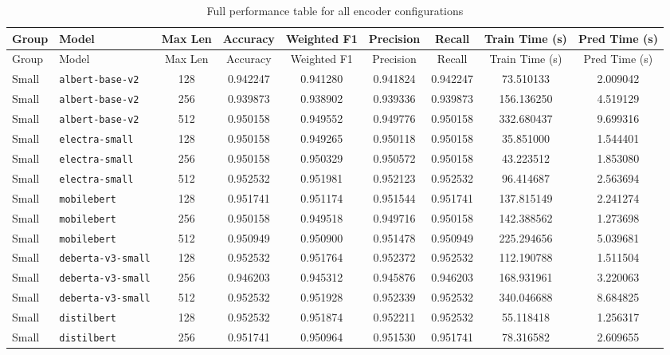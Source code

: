 \documentclass[11pt]{article}
\begin{document}
\begin{landscape}
\scriptsize
\begin{longtable}{llccccccc}
\caption{Full performance table for all encoder configurations} \\
\toprule
Group & Model & Max Len & Accuracy & Weighted F1 & Precision & Recall & Train Time (s) & Pred Time (s) \\
\midrule
\endfirsthead
\toprule
Group & Model & Max Len & Accuracy & Weighted F1 & Precision & Recall & Train Time (s) & Pred Time (s) \\
\midrule
\endhead

Small & \texttt{albert-base-v2} & 128 & 0.942247 & 0.941280 & 0.941824 & 0.942247 & 73.510133 & 2.009042 \\
Small & \texttt{albert-base-v2} & 256 & 0.939873 & 0.938902 & 0.939336 & 0.939873 & 156.136250 & 4.519129 \\
Small & \texttt{albert-base-v2} & 512 & 0.950158 & 0.949552 & 0.949776 & 0.950158 & 332.680437 & 9.699316 \\
Small & \texttt{electra-small} & 128 & 0.950158 & 0.949265 & 0.950118 & 0.950158 & 35.851000 & 1.544401 \\
Small & \texttt{electra-small} & 256 & 0.950158 & 0.950329 & 0.950572 & 0.950158 & 43.223512 & 1.853080 \\
Small & \texttt{electra-small} & 512 & 0.952532 & 0.951981 & 0.952123 & 0.952532 & 96.414687 & 2.563694 \\
Small & \texttt{mobilebert} & 128 & 0.951741 & 0.951174 & 0.951544 & 0.951741 & 137.815149 & 2.241274 \\
Small & \texttt{mobilebert} & 256 & 0.950158 & 0.949518 & 0.949716 & 0.950158 & 142.388562 & 1.273698 \\
Small & \texttt{mobilebert} & 512 & 0.950949 & 0.950900 & 0.951478 & 0.950949 & 225.294656 & 5.039681 \\
Small & \texttt{deberta-v3-small} & 128 & 0.952532 & 0.951764 & 0.952372 & 0.952532 & 112.190788 & 1.511504 \\
Small & \texttt{deberta-v3-small} & 256 & 0.946203 & 0.945312 & 0.945876 & 0.946203 & 168.931961 & 3.220063 \\
Small & \texttt{deberta-v3-small} & 512 & 0.952532 & 0.951928 & 0.952339 & 0.952532 & 340.046688 & 8.684825 \\
Small & \texttt{distilbert} & 128 & 0.952532 & 0.951874 & 0.952211 & 0.952532 & 55.118418 & 1.256317 \\
Small & \texttt{distilbert} & 256 & 0.951741 & 0.950964 & 0.951530 & 0.951741 & 78.316582 & 2.609655 \\

\end{longtable}
\end{landscape}
\end{document}
